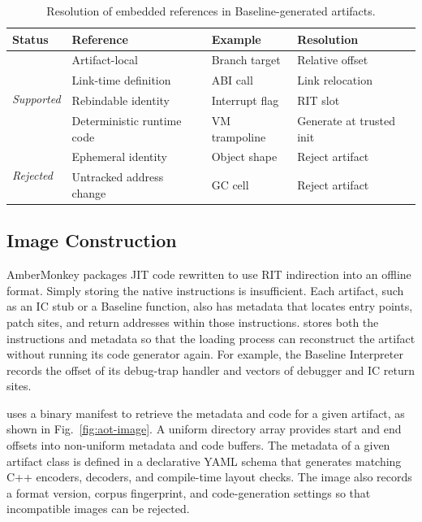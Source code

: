 \documentclass[sigplan,screen,review,anonymous]{acmart}
\newcommand{\AM}{\leavevmode{\sc AmberMonkey}}
\begin{document}
\begin{table}[t!]
  \caption{Resolution of embedded references in Baseline-generated artifacts.}
  \label{tab:runtime-deps}
  \centering
  \footnotesize
  \setlength{\tabcolsep}{2.5pt}
  \setlength{\aboverulesep}{1pt}
  \setlength{\belowrulesep}{1pt}
  \renewcommand{\arraystretch}{0.95}
  \begin{tabular}{@{}llll@{}}
    \toprule
    \textbf{Status} & \textbf{Reference} & \textbf{Example} & \textbf{Resolution}\\
    \midrule
    \multirow[c]{4}{*}{\textit{Supported}}
      & Artifact-local & Branch target & Relative offset\\
      & Link-time definition & ABI call & Link relocation\\
      & Rebindable identity & Interrupt flag & RIT slot\\
      & Deterministic runtime code & VM trampoline & Generate at trusted init\\
    \midrule
    \multirow[c]{2}{*}{\textit{Rejected}}
      & Ephemeral identity & Object shape & Reject artifact\\
      & Untracked address change & GC cell & Reject artifact\\
    \bottomrule
  \end{tabular}
\end{table}

\subsection{Image Construction}
\label{sec:image-construction}

AmberMonkey packages JIT code rewritten to use RIT indirection into an offline format. Simply storing the native instructions is insufficient. Each artifact, such as an IC stub or a Baseline function, also has metadata that locates entry points, patch sites, and return addresses within those instructions. \AM{} stores both the instructions and metadata so that the loading process can reconstruct the artifact without running its code generator again. For example, the Baseline Interpreter records the offset of its debug-trap handler and vectors of debugger and IC return sites.

\AM{} uses a binary manifest to retrieve the metadata and code for a given artifact, as shown in Fig.~\ref{fig:aot-image}. A uniform directory array provides start and end offsets into non-uniform metadata and code buffers. The metadata of a given artifact class is defined in a declarative YAML schema that generates matching C++ encoders, decoders, and compile-time layout checks. The image also records a format version, corpus fingerprint, and code-generation settings so that incompatible images can be rejected.
\end{document}
